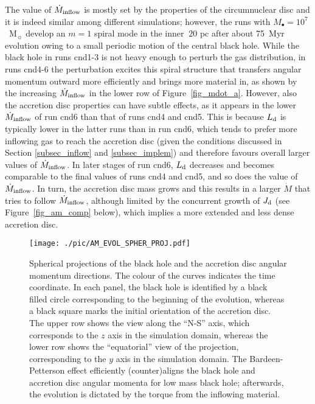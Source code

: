\documentclass[a4paper,fleqn,usenatbib]{mnras}
\begin{document}
The value of $\dot{M}_{\rm inflow}$ is mostly set by the properties of the circumnuclear disc and it is indeed similar among different simulations; however, the runs with $M_{\bullet} = 10^{7}$~M$_{\sun}$ develop an $m=1$ spiral mode in the inner $~20$ pc after about 75~Myr evolution owing to a small periodic motion of the central black hole. 
While the black hole in runs cnd1-3 is not heavy enough to perturb the gas distribution, in runs cnd4-6 the perturbation excites this spiral structure that transfers angular momentum outward more efficiently and brings more material in, as shown by the increasing $\dot{M}_{\rm inflow}$ in the lower row of Figure~\ref{fig_mdot_a}.
However, also the accretion disc properties can have subtle effects, as it appears in the lower $\dot{M}_{\rm inflow}$ of run cnd6 than that of runs cnd4 and cnd5.
This is because $L_{\rm d}$ is typically lower in the latter runs than in run cnd6, which tends to prefer more inflowing gas to reach the accretion disc (given the conditions discussed in Section \ref{subsec_inflow} and \ref{subsec_implem}) and therefore favours overall larger values of $\dot{M}_{\rm inflow}$.
In later stages of run cnd6, $L_{\rm d}$ decreases and becomes comparable to the final values of runs cnd4 and cnd5, and so does the value of $\dot{M}_{\rm inflow}$.
In turn, the accretion disc mass grows and this results in a larger $\dot{M}$ that tries to follow $\dot{M}_{\rm inflow}$, although limited by the concurrent growth of $J_{\rm d}$ (see Figure~\ref{fig_am_comp} below), which implies a more extended and less dense accretion disc.

\begin{figure*}
\begin{center}
\texttt{[image: ./pic/AM\_EVOL\_SPHER\_PROJ.pdf]}
\caption{Spherical projections of the black hole and the accretion disc angular momentum directions.
The colour of the curves indicates the time coordinate.
In each panel, the black hole is identified by a black filled circle corresponding to the beginning of the evolution, whereas a black square marks the initial orientation of the accretion disc.
The upper row shows the view along the ``N-S'' axis, which corresponds to the $z$ axis in the simulation domain, whereas the lower row shows the ``equatorial'' view of the projection, corresponding to the $y$ axis in the simulation domain.
The Bardeen-Petterson effect efficiently (counter)aligns the black hole and accretion disc angular momenta for low mass black hole; afterwards, the evolution is dictated by the torque from the inflowing material. 
} 
\label{fig_am_proj}
\end{center}
\end{figure*}
\end{document}
